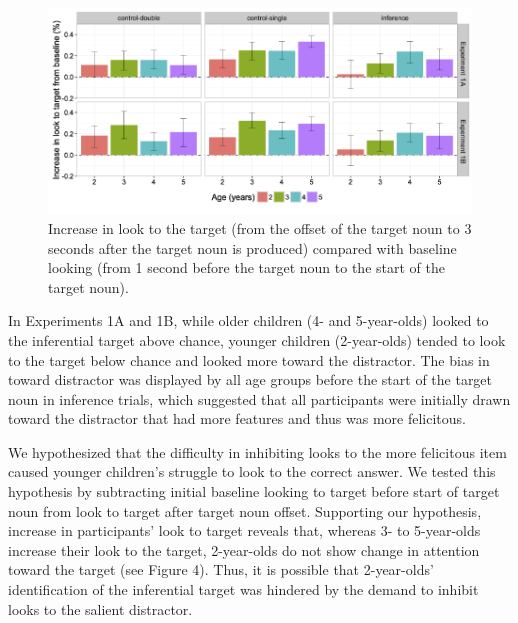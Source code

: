 \documentclass[a4paper,man,apacite,floatsintext]{apa6}
\newenvironment{CodeChunk}{}{}
\begin{document}
\begin{CodeChunk}
\begin{figure}[H]

{\centering \includegraphics{figs/et_difference-1} 

}

\caption[Increase in look to the target (from the offset of the target noun to 3 seconds after the target noun is produced) compared with baseline looking (from 1 second before the target noun to the start of the target noun)]{Increase in look to the target (from the offset of the target noun to 3 seconds after the target noun is produced) compared with baseline looking (from 1 second before the target noun to the start of the target noun).}\label{fig:et_difference}
\end{figure}
\end{CodeChunk}

In Experiments 1A and 1B, while older children (4- and 5-year-olds)
looked to the inferential target above chance, younger children
(2-year-olds) tended to look to the target below chance and looked more
toward the distractor. The bias in toward distractor was displayed by
all age groups before the start of the target noun in inference trials,
which suggested that all participants were initially drawn toward the
distractor that had more features and thus was more felicitous.

We hypothesized that the difficulty in inhibiting looks to the more
felicitous item caused younger children's struggle to look to the
correct answer. We tested this hypothesis by subtracting initial
baseline looking to target before start of target noun from look to
target after target noun offset. Supporting our hypothesis, increase in
participants' look to target reveals that, whereas 3- to 5-year-olds
increase their look to the target, 2-year-olds do not show change in
attention toward the target (see Figure 4). Thus, it is possible that
2-year-olds' identification of the inferential target was hindered by
the demand to inhibit looks to the salient distractor.
\end{document}
